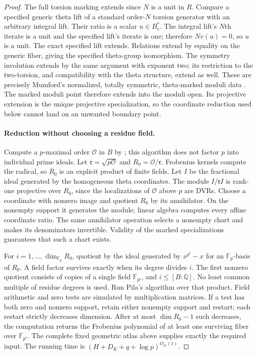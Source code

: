 \documentclass[11pt]{article}
\theoremstyle{definition}
\theoremstyle{remark}
\begin{document}
\begin{proof}
The full torsion marking extends since $N$ is a unit in $R$.  Compare a
specified generic theta lift of a standard order-$N$ torsion generator with
an arbitrary integral lift.  Their ratio is a scalar $u\in B_v^*$.
The integral lift's $N$th iterate is a unit and the specified lift's iterate
is one; therefore $Nv(u)=0$, so $u$ is a unit.  The exact specified lift
extends.  Relations extend by equality on the generic fiber, giving the
specified theta-group isomorphism.  The symmetry involution extends by the
same argument with exponent two; its restriction to the two-torsion, and
compatibility with the theta structure, extend as well.  These are precisely
Mumford's normalized, totally symmetric, theta-marked moduli data
\cite[Section 6, pp.~76--79, 83]{Mumford1967}.
The marked moduli point therefore extends into the moduli open.  Its
projective extension is the unique projective specialization, so the
coordinate reduction used below cannot land on an unwanted boundary point.

\paragraph{Reduction without choosing a residue field.}
Compute a $p$-maximal order $\mathcal O$ in $B$ by
\cite[Algorithm~6.1 and Proposition~6.2, pp.~246--247]{BuchmannLenstra1994}; this algorithm does not factor $p$ into
individual prime ideals.  Let
$\mathfrak r=\sqrt{p\mathcal O}$ and $R_0=\mathcal O/\mathfrak r$.
Frobenius kernels compute the radical, so $R_0$ is an explicit product of
finite fields.  Let $I$ be the fractional ideal generated by the homogeneous
theta coordinates.  The module $I/\mathfrak r I$ is rank-one projective over
$R_0$, since the localizations of $\mathcal O$ above $p$ are DVRs.
Choose a coordinate with nonzero image and quotient $R_0$ by its
annihilator.  On the nonempty support it generates the module;
linear algebra computes every affine coordinate ratio.  The same
annihilator operation selects a nonempty chart and makes its denominators
invertible.  Validity of the marked specializations guarantees that such a
chart exists.

For $i=1,\ldots,\dim_{\mathbb F_p}R_0$, quotient by the ideal generated by
$x^{p^i}-x$ for an $\mathbb F_p$-basis of $R_0$.  A field factor survives
exactly when its degree divides $i$.  The first nonzero quotient consists of
copies of a single field $\mathbb F_{p^i}$, and
$i\leq[B:\mathbb Q]$.  No least common multiple of residue degrees is used.
Run Pila's algorithm over that product.  Field arithmetic and zero tests
are simulated by multiplication matrices.  If a test has both zero and
nonzero support, retain either nonempty support and restart; each restart
strictly decreases dimension.  After at most $\dim R_0-1$ such decreases,
the computation returns the Frobenius polynomial of at least one surviving
fiber over $\mathbb F_{p^i}$.  The complete fixed geometric atlas above
supplies exactly the required input.  The running time is $(H+D_K+q+\log p)^{O_m(1)}$.


\end{proof}
\end{document}
